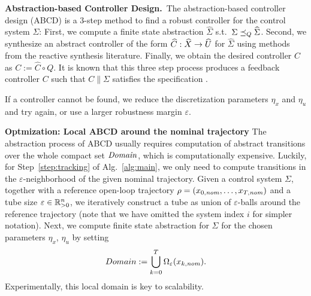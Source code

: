 \smallskip
\noindent\textbf{Abstraction-based Controller Design.}\
The abstraction-based controller design (ABCD) \cite{reissig2016feedback} is a $3$-step method to find a robust controller for the control system $\Sigma$:
First, we compute a finite state abstraction $\widehat{\Sigma}$ s.t.\ $\Sigma \preceq_{Q} \widehat{\Sigma}$.
Second, we synthesize an abstract controller of the form $\widehat{C}:\widehat{X}\rightarrow \widehat{U}$ for $\widehat{\Sigma}$ using methods from the reactive synthesis literature.
Finally, we obtain the desired controller $C$ as $C:=\widehat{C}\circ Q$.
It is known that this three step process produces a feedback controller $C$ such that $C\parallel \Sigma$ satisfies the specification \cite{reissig2016feedback}.

If a controller cannot be found, we reduce the discretization parameters $\eta_x$ and $\eta_u$ and try again,
or use a larger robustness margin $\varepsilon$.




\smallskip
\noindent\textbf{Optmization: Local ABCD around the nominal trajectory}\hfill
%
The abstraction process of ABCD usually requires computation of abstract transitions over the whole compact set $\mathit{Domain}$, which is computationally expensive.
Luckily, for Step~\ref{step:tracking} of Alg.~\ref{alg:main}, we only need to compute transitions in the $\varepsilon$-neighborhood of the given nominal trajectory.
Given a control system $\Sigma$, together with a reference open-loop trajectory $\rho=(x_{0,\mathit{nom}},\ldots,x_{T,\mathit{nom}})$ and a tube size $\varepsilon\in \mathbb{R}_{>0}^n$, we iteratively construct a tube as union of $\varepsilon$-balls around the reference trajectory (note that we have omitted  the system index $i$ for simpler notation).
Next, we compute finite state abstraction for $\Sigma$ for the chosen parameters $\eta_x$, $\eta_u$ by setting
\begin{equation*}
Domain:=\bigcup_{k=0}^T\Omega_{\varepsilon}(x_{k,\mathit{nom}}).
\end{equation*}
%
Experimentally, this local domain is key to scalability.
% 

